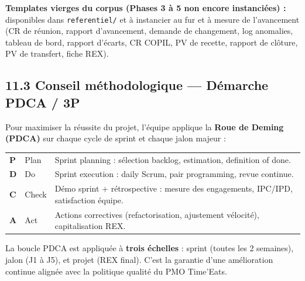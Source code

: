 \documentclass[11pt,a4paper,oneside]{report}
\begin{document}
\textbf{Templates vierges du corpus (Phases 3 à 5 non encore instanciées) :} disponibles dans \texttt{referentiel/} et à instancier au fur et à mesure de l'avancement (CR de réunion, rapport d'avancement, demande de changement, log anomalies, tableau de bord, rapport d'écarts, CR COPIL, PV de recette, rapport de clôture, PV de transfert, fiche REX).

\subsection*{11.3 Conseil méthodologique --- Démarche PDCA / 3P}

Pour maximiser la réussite du projet, l'équipe applique la \textbf{Roue de Deming (PDCA)} sur chaque cycle de sprint et chaque jalon majeur :

\renewcommand{\arraystretch}{1.4}
\begin{tabularx}{\textwidth}{L{1.5cm} L{2.5cm} Y}
\toprule
{} &  &  \\
\midrule
\textbf{P} & Plan      & Sprint planning : sélection backlog, estimation, definition of done. \\
\textbf{D} & Do        & Sprint execution : daily Scrum, pair programming, revue continue. \\
\textbf{C} & Check     & Démo sprint + rétrospective : mesure des engagements, IPC/IPD, satisfaction équipe. \\
\textbf{A} & Act       & Actions correctives (refactorisation, ajustement vélocité), capitalisation REX. \\
\bottomrule
\end{tabularx}

\begin{reco}
La boucle PDCA est appliquée à \textbf{trois échelles} : sprint (toutes les 2 semaines), jalon (J1 à J5), et projet (REX final). C'est la garantie d'une amélioration continue alignée avec la politique qualité du PMO Time'Eats.
\end{reco}
\end{document}
